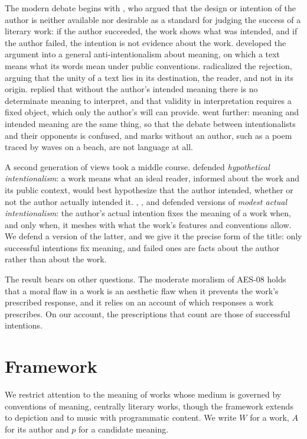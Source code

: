 \documentclass{situationist-preprint}
\begin{document}
The modern debate begins with \citet{WimsattBeardsley1946}, who argued that the design or intention of the author is neither available nor desirable as a standard for judging the success of a literary work: if the author succeeded, the work shows what was intended, and if the author failed, the intention is not evidence about the work. \citet{Beardsley1958} developed the argument into a general anti-intentionalism about meaning, on which a text means what its words mean under public conventions. \citet{Barthes1977} radicalized the rejection, arguing that the unity of a text lies in its destination, the reader, and not in its origin. \citet{Hirsch1967} replied that without the author's intended meaning there is no determinate meaning to interpret, and that validity in interpretation requires a fixed object, which only the author's will can provide. \citet{KnappMichaels1982} went further: meaning and intended meaning are the same thing, so that the debate between intentionalists and their opponents is confused, and marks without an author, such as a poem traced by waves on a beach, are not language at all.

A second generation of views took a middle course. \citet{Levinson1992} defended \emph{hypothetical intentionalism}: a work means what an ideal reader, informed about the work and its public context, would best hypothesize that the author intended, whether or not the author actually intended it. \citet{Carroll1992,Carroll2000}, \citet{Iseminger1996}, \citet{Stecker2003} and \citet{Livingston2005} defended versions of \emph{modest actual intentionalism}: the author's actual intention fixes the meaning of a work when, and only when, it meshes with what the work's features and conventions allow. We defend a version of the latter, and we give it the precise form of the title: only successful intentions fix meaning, and failed ones are facts about the author rather than about the work.

The result bears on other questions. The moderate moralism of AES-08 holds that a moral flaw in a work is an aesthetic flaw when it prevents the work's prescribed response, and it relies on an account of which responses a work prescribes. On our account, the prescriptions that count are those of successful intentions.

\section{Framework}

We restrict attention to the meaning of works whose medium is governed by conventions of meaning, centrally literary works, though the framework extends to depiction and to music with programmatic content. We write $W$ for a work, $A$ for its author and $p$ for a candidate meaning.
\end{document}
